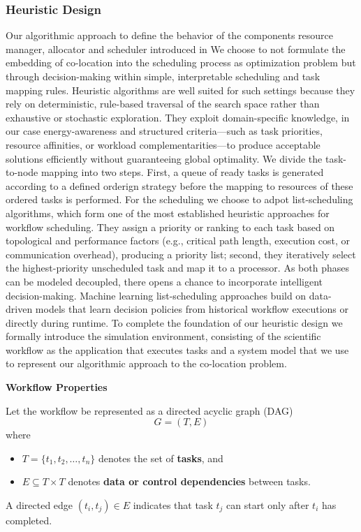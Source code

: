 \subsubsection{Heuristic Design}
\label{sec:heuristic_design}
Our algorithmic approach to define the behavior of the components resource manager, allocator and scheduler introduced in %
We choose to not formulate the embedding of co-location into the scheduling process as optimization problem but through decision-making within simple, interpretable scheduling and task mapping rules. Heuristic algorithms are well suited for such settings because they rely on deterministic, rule-based traversal of the search space rather than exhaustive or stochastic exploration. They exploit domain-specific knowledge, in our case energy-awareness and structured criteria—such as task priorities, resource affinities, or workload complementarities—to produce acceptable solutions efficiently without guaranteeing global optimality. We divide the task-to-node mapping into two steps. First, a queue of ready tasks is generated according to a defined orderign strategy before the mapping to resources of these ordered tasks is performed. For the scheduling we choose to adpot list-scheduling algorithms, which form one of the most established heuristic approaches for workflow scheduling. They assign a priority or ranking to each task based on topological and performance factors (e.g., critical path length, execution cost, or communication overhead), producing a priority list; second, they iteratively select the highest-priority unscheduled task and map it to a processor. As both phases can be modeled decoupled, there opens a chance to incorporate intelligent decision-making.
Machine learning list-scheduling approaches build on data-driven models that learn decision policies from historical workflow executions or directly during runtime. To complete the foundation of our heuristic design we formally introduce the simulation environment, consisting of the scientific workflow as the application that executes tasks and a system model that we use to represent our algorithmic approach to the co-location problem.


\textbf{Workflow Properties}

Let the workflow be represented as a directed acyclic graph (DAG)
\[
    G = (T, E)
\]
where
\begin{itemize}
    \item $T = \{t_1, t_2, \dots, t_n\}$ denotes the set of \textbf{tasks}, and
    \item $E \subseteq T \times T$ denotes \textbf{data or control dependencies} between tasks.
\end{itemize}
A directed edge $(t_i, t_j) \in E$ indicates that task $t_j$ can start only after $t_i$ has completed.

